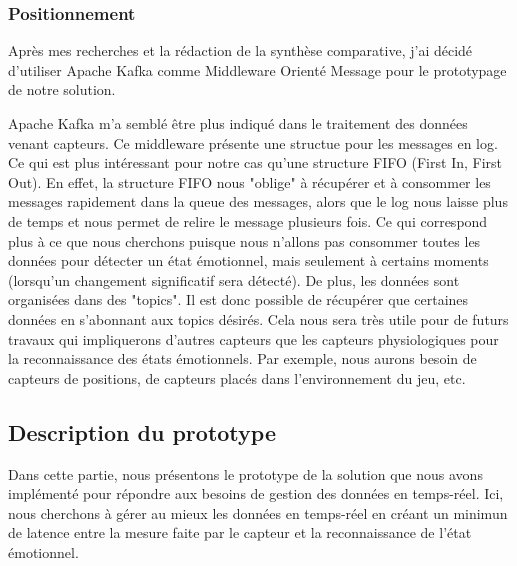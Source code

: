 \documentclass{article}
\begin{document}
		\subsubsection{Positionnement}\label{sec:position}
			Après mes recherches et la rédaction de la synthèse comparative, j'ai décidé d'utiliser Apache Kafka comme Middleware Orienté Message pour le prototypage de notre solution.\par
			Apache Kafka m'a semblé être plus indiqué dans le traitement des données venant capteurs.
			Ce middleware présente une structue pour les messages en log.
			Ce qui est plus intéressant pour notre cas qu'une structure FIFO (First In, First Out).
			En effet, la structure FIFO nous "oblige" à récupérer et à consommer les messages rapidement dans la queue des messages, alors que le log nous laisse plus de temps et nous permet de relire le message plusieurs fois.
			Ce qui correspond plus à ce que nous cherchons puisque nous n'allons pas consommer toutes les données pour détecter un état émotionnel, mais seulement à certains moments (lorsqu'un changement significatif sera détecté).
			De plus, les données sont organisées dans des "topics". 
			Il est donc possible de récupérer que certaines données en s'abonnant aux topics désirés.
			Cela nous sera très utile pour de futurs travaux qui impliquerons d'autres capteurs que les capteurs physiologiques pour la reconnaissance des états émotionnels.
			Par exemple, nous aurons besoin de capteurs de positions, de capteurs placés dans l'environnement du jeu, etc.
	\subsection{Description du prototype}\label{sec:protodesc}
		Dans cette partie, nous présentons le prototype de la solution que nous avons implémenté pour répondre aux besoins de gestion des données en temps-réel.
		Ici, nous cherchons à gérer au mieux les données en temps-réel en créant un minimun de latence entre la mesure faite par le capteur et la reconnaissance de l'état émotionnel.
\end{document}
